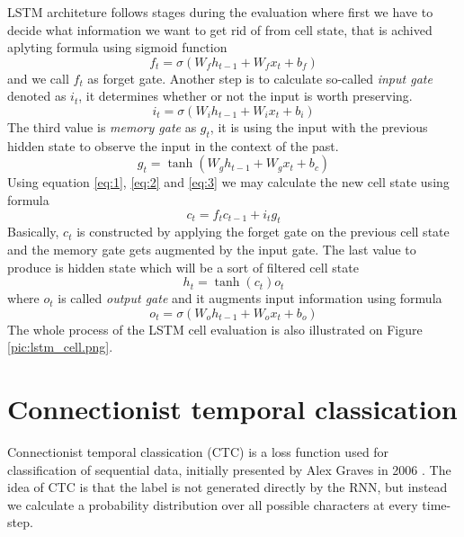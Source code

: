 LSTM architeture follows stages during the evaluation where first we have to decide what information we want to get rid of from cell state, that is achived aplyting formula using sigmoid function
\begin{equation} \label{eq:1}
  f_t = {\sigma}({W_f}{h_{t-1}} + {W_f}{x_t} + b_f)
\end{equation}
and we call $f_t$ as forget gate.
Another step is to calculate so-called \textit{input gate} denoted as $i_t$, it determines whether or not the input is worth preserving.
\begin{equation} \label{eq:2}
  i_t = {\sigma}({W_i}{h_{t-1}} + {W_i}{x_t} + b_i)
\end{equation}
The third value is \textit{memory gate} as ${g_t}$, it is using the input with the previous hidden state to observe the input in the context of the past.
\begin{equation} \label{eq:3}
  {g_t} = {\tanh}({W_g}{h_{t-1}} + {W_g}{x_t} + b_c)
\end{equation}
Using equation \ref{eq:1}, \ref{eq:2} and \ref{eq:3} we may calculate the new cell state using formula
\begin{equation} \label{eq:4}
  {c_t} = {f_t}{c_{t-1}} + {i_t}{g_t}
\end{equation}
Basically, $c_t$ is constructed by applying the forget gate on the previous cell state and the memory gate gets augmented by the input gate.
The last value to produce is hidden state which will be a sort of filtered cell state
\begin{equation} \label{eq:5}
  {h_t} = {\tanh}(c_t)o_t
\end{equation}
where $o_t$ is called \textit{output gate} and it augments input information using formula
\begin{equation} \label{eq:6}
  {o_t} = {\sigma}({W_o}{h_{t-1}} + {W_o}{x_t} + b_o)
\end{equation}
The whole process of the LSTM cell evaluation is also illustrated on Figure \ref{pic:lstm_cell.png}.


\section{Connectionist temporal classication}
\label{ctc}

Connectionist temporal classication (CTC) is a loss function used for classification of sequential data, initially presented by Alex Graves in 2006 \cite{ctc}.
The idea of CTC is that the label is not generated directly by the RNN, but instead we calculate a probability distribution over all possible characters at every time-step.

